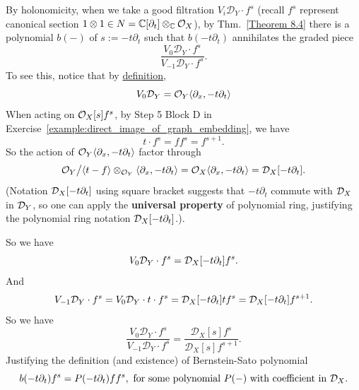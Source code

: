 \begin{remark}
    By holonomicity, when we take a good filtration $V_i \mathcal{D}_Y \cdot f^s$
    (recall $f^s$ represent canonical section $1\otimes 1 \in N = \mathbb{C}[\partial_t]\otimes_{\mathbb{C}} \mathcal{O}_X$), by Thm.~\ref{Theorem 8.4}
    there is a polynomial $b(-)$ of $s := -t\partial_t$ such that $b(-t\partial_t)$ annihilates the graded piece
    \[
        \frac{V_0 \mathcal{D}_Y \cdot f^s}{V_{-1} \mathcal{D}_Y \cdot f^s}.
    \]
    To see this, notice that by \hyperref[def:definition_of_V_filtration]{definition},
    \[
        V_0\mathcal{D}_Y = \mathcal{O}_Y\langle \partial_x, -t\partial_t \rangle
    \]
    When acting on $\mathcal{O}_X[s]f^s$, by Step 5 Block D in Exercise~\ref{example:direct_image_of_graph_embedding}, we have
    \[
        t \cdot f^s = f f^s = f^{s+1}.
    \]
    So the action of $\mathcal{O}_Y\langle \partial_x, -t\partial_t \rangle$ factor through
    \[
        \mathcal{O}_Y\big/\langle t-f \rangle \otimes_{\mathcal{O}_Y} \langle \partial_x, -t\partial_t \rangle = \mathcal{O}_X\langle \partial_x, -t\partial_t \rangle = \mathcal{D}_X[-t\partial_t].
    \]
    (Notation $\mathcal{D}_X[-t\partial_t]$ using square bracket suggests that $-t\partial_t$ commute with $\mathcal{D}_X$ in $\mathcal{D}_Y$,
    so one can apply the \textbf{universal property} of polynomial ring, justifying the polynomial ring notation $\mathcal{D}_X[-t\partial_t]$.).

    \noindent So we have
    \[
        V_0\mathcal{D}_Y \cdot f^s = \mathcal{D}_X[-t\partial_t]f^s.
    \]
    And
    \[
        V_{-1}\mathcal{D}_Y \cdot f^s = V_0\mathcal{D}_Y \cdot t \cdot f^s = \mathcal{D}_X[-t\partial_t]t f^s = \mathcal{D}_X[-t\partial_t]f^{s+1}.
    \]
    So we have
    \[
        \frac{V_0 \mathcal{D}_Y \cdot f^s}{V_{-1} \mathcal{D}_Y \cdot f^s} = \frac{\mathcal{D}_X[s] f^s}{\mathcal{D}_X[s] f^{s+1}}.
    \]
    Justifying the definition (and existence) of Bernstein-Sato polynomial
    \[
        b(-t\partial_t) f^s = P(-t\partial_t) ff^{s}, \text{ for some polynomial $P(-)$ with coefficient in $\mathcal{D}_X$}.
    \]

\end{remark}
